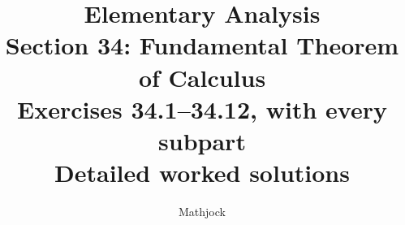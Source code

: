 
\title{\textbf{Elementary Analysis}\\[0.3em]
Section 34: Fundamental Theorem of Calculus\\[0.4em]
\large Exercises 34.1--34.12, with every subpart\\
Detailed worked solutions}
\author{Mathjock}
\date{}

\maketitle
\bookinfo
\tableofcontents
\clearpage
\setcounter{section}{33}


